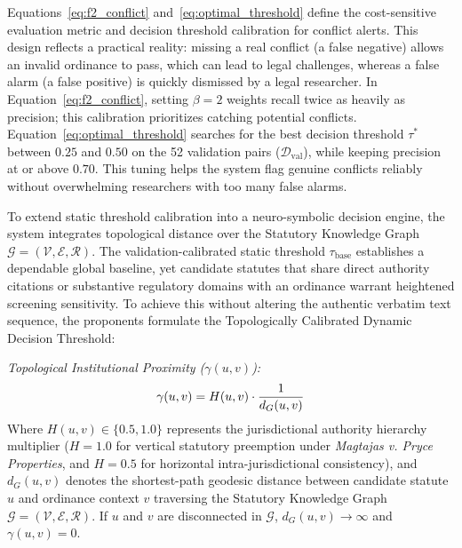     Equations~\ref{eq:f2_conflict} and~\ref{eq:optimal_threshold} define the cost-sensitive evaluation metric and decision threshold calibration for conflict alerts. This design reflects a practical reality: missing a real conflict (a false negative) allows an invalid ordinance to pass, which can lead to legal challenges, whereas a false alarm (a false positive) is quickly dismissed by a legal researcher. In Equation~\ref{eq:f2_conflict}, setting $\beta = 2$ weights recall twice as heavily as precision; this calibration prioritizes catching potential conflicts. Equation~\ref{eq:optimal_threshold} searches for the best decision threshold $\tau^*$ between $0.25$ and $0.50$ on the 52 validation pairs ($\mathcal{D}_{\text{val}}$), while keeping precision at or above $0.70$. This tuning helps the system flag genuine conflicts reliably without overwhelming researchers with too many false alarms.

    To extend static threshold calibration into a neuro-symbolic decision engine, the system integrates topological distance over the Statutory Knowledge Graph $\mathcal{G} = (\mathcal{V}, \mathcal{E}, \mathcal{R})$. The validation-calibrated static threshold $\tau_{\text{base}}$ establishes a dependable global baseline, yet candidate statutes that share direct authority citations or substantive regulatory domains with an ordinance warrant heightened screening sensitivity. To achieve this without altering the authentic verbatim text sequence, the proponents formulate the Topologically Calibrated Dynamic Decision Threshold:

    \noindent\textit{Topological Institutional Proximity ($\gamma(u, v)$):}
    \begin{equation}
        \gamma(u, v) = H(u, v) \cdot \frac{1}{d_G(u, v)}
        \label{eq:topological_proximity}
        \eqcaption{Topological Institutional Proximity ($\gamma(u, v)$)}
    \end{equation}
    \noindent Where $H(u, v) \in \{0.5, 1.0\}$ represents the jurisdictional authority hierarchy multiplier ($H = 1.0$ for vertical statutory preemption under \textit{Magtajas v. Pryce Properties}, and $H = 0.5$ for horizontal intra-jurisdictional consistency), and $d_G(u, v)$ denotes the shortest-path geodesic distance between candidate statute $u$ and ordinance context $v$ traversing the Statutory Knowledge Graph $\mathcal{G} = (\mathcal{V}, \mathcal{E}, \mathcal{R})$. If $u$ and $v$ are disconnected in $\mathcal{G}$, $d_G(u, v) \to \infty$ and $\gamma(u, v) = 0$.

